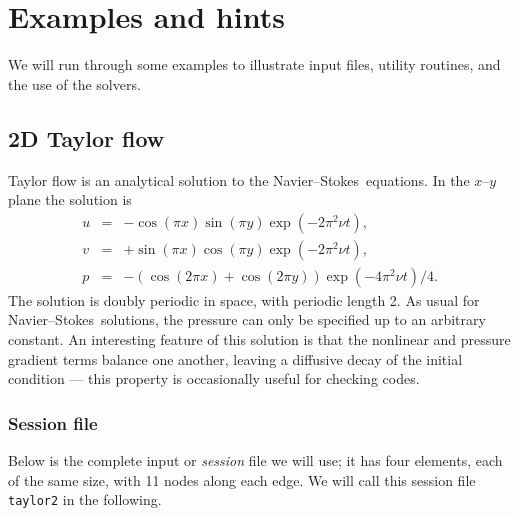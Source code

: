 \documentclass[11pt,a4paper]{report}
\newcommand\NavSto{Navier--Stokes}
\begin{document}
\chapter{Examples and hints}

We will run through some examples to illustrate input files, utility
routines, and the use of the solvers.

\section{2D Taylor flow}

Taylor flow is an analytical solution to the \NavSto\ equations.
In the $x$--$y$ plane the solution is 
\begin{eqnarray}
        u &=& -\cos(\pi x) \sin(\pi y) \exp(-2\pi^2\nu t),\\
        v &=& +\sin(\pi x) \cos(\pi y) \exp(-2\pi^2\nu t),\\
        p &=& -(\cos(2\pi x) + \cos(2\pi y)) \exp(-4\pi^2\nu t)/4.
\end{eqnarray}
The solution is doubly periodic in space, with periodic length 2.  As
usual for \NavSto\ solutions, the pressure can only be specified
up to an arbitrary constant.  An interesting feature of this solution
is that the nonlinear and pressure gradient terms balance one another,
leaving a diffusive decay of the initial condition --- this property
is occasionally useful for checking codes.

\subsection{Session file}

Below is the complete input or \emph{session} file we will use; it
has four elements, each of the same size, with 11 nodes along each
edge.  We will call this session file \texttt{taylor2} in the
following.
\end{document}
